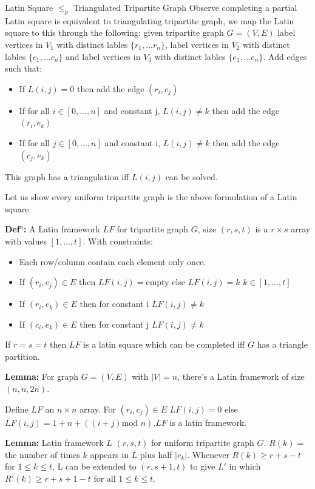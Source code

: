 \documentclass[final]{beamer}
\newlength{\colwidth}
\newcounter{row}
\newcounter{col}
\begin{document}
\begin{frame}[t]
\begin{columns}[t]
\begin{column}{\colwidth}
\begin{block}{Latin Square $\leq_p$ Triangulated Tripartite Graph}
Observe completing a partial Latin square is equivalent to triangulating tripartite graph, we map the Latin square to this through the following: 
given tripartite graph $G=(V,E)$ label vertices in $V_1$ with distinct lables $\{r_1,...r_n\}$, label vertices in $V_2$ with distinct lables $\{c_1,...c_n\}$ and label vertices in $V_3$ with distinct lables $\{e_1,...e_n\}$. Add edges such that:

\begin{itemize}
\item{If $L(i,j) = 0$ then add the edge $(r_i,c_j)$ }
\item{If for all $i \in [0,...,n]$ and constant j, $L(i,j) \neq k$ then add the edge $(r_i,e_k)$}
\item{If for all $j \in [0,...,n]$ and constant i, $L(i,j) \neq k$ then add the edge $(c_j,e_k)$}
\end{itemize}
This graph has a triangulation iff $L(i,j)$ can be solved.

Let us show every uniform tripartite graph is the above formulation of a Latin square.

\textbf{Def$^{\text{n}}$:} A Latin framework $LF$ for tripartite graph $G$, size $(r,s,t)$ is a $r \times s$ array with values $[1,...,t]$. With constraints:
\begin{itemize}
\item{Each row/column contain each element only once.}
\item{If $(r_i,c_j)\in E$ then $LF(i,j)=$empty else $LF(i,j)= k$ $k\in [1,...,t]$}
\item{If $(r_i,e_k)\in E$  then for constant i $LF(i,j)\neq k$}
\item{If $(c_i,e_k)\in E$  then for constant j $LF(i,j)\neq k$}
\end{itemize}
If $r=s=t$ then $LF$ is a latin square which can be completed iff $G$ has a triangle partition.

\textbf{Lemma:} For graph $G=(V,E)$ with $|V|=n$, there's a Latin framework of size $(n,n,2n)$.

Define $LF$ an $n \times n$ array. For $(r_i,c_j)\in E$ $LF(i,j)=0$ else $LF(i,j)=1+n+((i+j)\text{mod }n)$.$ LF$ is a latin framework. 

\textbf{Lemma:} Latin framework $L$  $(r,s,t)$ for uniform tripartite graph $G$. $R(k) =$ the number of times $k$ appears in $L$ plus half $|e_k|$. Whenever $R(k)\ge r+s-t$ for $1 \le k \le t$, L can be extended to $(r,s+1,t)$ to give $L'$ in which $R'(k)\ge r + s+1-t$ for all $1\le k \le t$.


\end{block}
\end{column}
\end{columns}
\end{frame}
\end{document}
